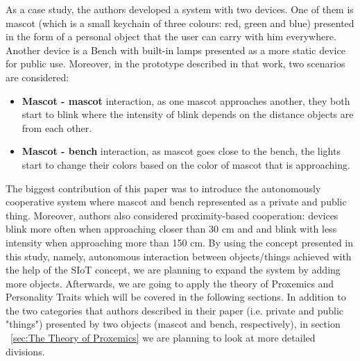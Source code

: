 As a case study, the authors developed a system with two devices.
One of them is mascot (which is a small keychain of three colours:
red, green and blue) presented in the form of a personal object that the user can carry with him everywhere.
Another device is a Bench with built-in lamps presented as a more static device for public use.
Moreover, in the prototype described in that work, two scenarios are considered:
\begin{itemize}
  \item \textbf{Mascot - mascot} interaction, as one mascot approaches another, they both start to blink where the
        intensity of blink depends on the distance objects are from each other.
  \item \textbf{Mascot - bench} interaction, as mascot goes close to the bench, the lights
        start to change their colors based on the color of mascot that is approaching.
\end{itemize}
The biggest contribution of this paper was to introduce the autonomously cooperative
system where mascot and bench represented as a private and public thing.
Moreover, authors also considered proximity-based cooperation: devices blink more often when
approaching closer than 30 cm and and blink with less intensity when approaching more than 150 cm.
By using the concept presented in this study, namely, autonomous interaction between objects/things
achieved with the help of the SIoT concept, we are planning to expand the system by adding more objects.
Afterwards, we are going to apply the theory of Proxemics and Personality
Traits which will be covered in the following sections.
In addition to the two categories that authors described in their paper (i.e. private and public "things")
presented by two objects (mascot and bench, respectively), in section ~\ref{sec:The Theory of Proxemics}
we are planning to look at more detailed divisions.

